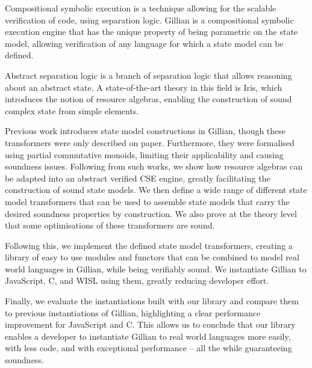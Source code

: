 Compositional symbolic execution is a technique allowing for the scalable verification of code, using separation logic. Gillian is a compositional symbolic execution engine that has the unique property of being parametric on the state model, allowing verification of any language for which a state model can be defined.

Abstract separation logic is a branch of separation logic that allows reasoning about an abstract state. A state-of-the-art theory in this field is Iris, which introduces the notion of resource algebras, enabling the construction of sound complex state from simple elements.

Previous work introduces state model constructions in Gillian, though these transformers were only described on paper. Furthermore, they were formalised using partial commutative monoids, limiting their applicability and causing soundness issues. Following from such works, we show how resource algebras can be adapted into an abstract verified CSE engine, greatly facilitating the construction of sound state models. We then define a wide range of different state model transformers that can be used to assemble state models that carry the desired soundness properties by construction. We also prove at the theory level that some optimisations of these transformers are sound.

Following this, we implement the defined state model transformers, creating a library of easy to use modules and functors that can be combined to model real world languages in Gillian, while being verifiably sound. We instantiate Gillian to JavaScript, C, and WISL using them, greatly reducing developer effort.

Finally, we evaluate the instantiations built with our library and compare them to previous instantiations of Gillian, highlighting a clear performance improvement for JavaScript and C. This allows us to conclude that our library enables a developer to instantiate Gillian to real world languages more easily, with less code, and with exceptional performance -- all the while guaranteeing soundness.
